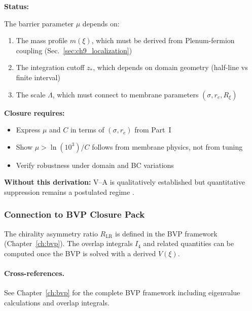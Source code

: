 \begin{tcolorbox}[colback=red!5!white, colframe=red!50!black,
    title=\textbf{Closure Condition: Derive $\mu$ from Membrane Parameters}]
\label{box:va_mu_closure}

\textbf{Status:} \tagOPEN{}

The barrier parameter $\mu$ depends on:
\begin{enumerate}[nosep]
    \item The mass profile $m(\xi)$, which must be derived from Plenum-fermion
          coupling (Sec.~\ref{sec:ch9_localization})
    \item The integration cutoff $z_*$, which depends on domain geometry
          (half-line vs finite interval)
    \item The scale $\Lambda$, which must connect to membrane parameters
          $(\sigma, r_e, R_\xi)$
\end{enumerate}

\textbf{Closure requires:}
\begin{itemize}[nosep]
    \item Express $\mu$ and $C$ in terms of $(\sigma, r_e)$ from Part~I
    \item Show $\mu > \ln(10^3)/C$ follows from membrane physics, not from tuning
    \item Verify robustness under domain and BC variations
\end{itemize}

\textbf{Without this derivation:} V--A is qualitatively established but
quantitative suppression remains a postulated regime \tagP{}.
\end{tcolorbox}

\subsubsection{Connection to BVP Closure Pack}

The chirality asymmetry ratio $R_{\text{LR}}$ is defined in the BVP framework
(Chapter~\ref{ch:bvp}). The overlap integrals $I_4$ and related quantities
can be computed once the BVP is solved with a derived $V(\xi)$.

\paragraph{Cross-references.}
See Chapter~\ref{ch:bvp} for the complete BVP framework including eigenvalue
calculations and overlap integrals.

